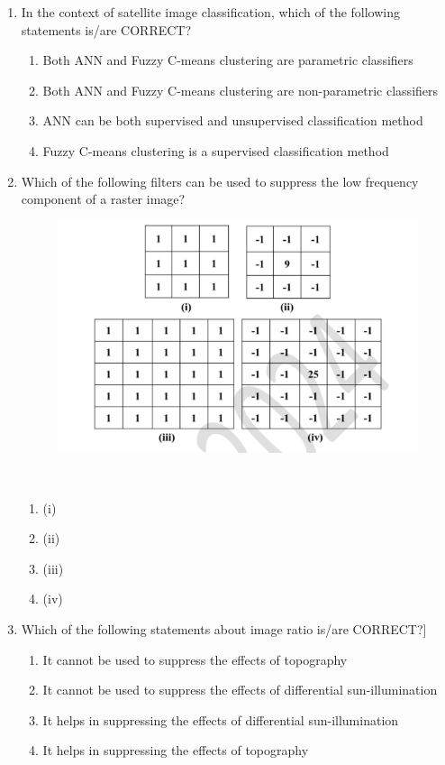 \documentclass[12pt]{article}
\begin{document}
\begin{enumerate}
\item In the context of satellite image classification, which of the following statements
is/are CORRECT? 
\begin{enumerate}
    \item Both ANN and Fuzzy C-means clustering are parametric classifiers 
   \item Both ANN and Fuzzy C-means clustering are non-parametric classifiers 
   \item ANN can be both supervised and unsupervised classification method 
   \item Fuzzy C-means clustering is a supervised classification method
\end{enumerate}

\item Which of the following filters can be used to suppress the low frequency component
of a raster image? \\

\begin{figure}[H]
\centering
\includegraphics[width=0.5\linewidth]{Figs/LatexImage11.png}
\end{figure} \\

 \begin{enumerate}
     \item(i) 
   \item (ii) 
   \item (iii) 
   \item (iv)
 \end{enumerate}

\item Which of the following statements about image ratio is/are CORRECT?]\\


\begin{enumerate}
    \item It cannot be used to suppress the effects of topography 
   \item It cannot be used to suppress the effects of differential sun-illumination 
   \item It helps in suppressing the effects of differential sun-illumination 
   \item It helps in suppressing the effects of topography 
\end{enumerate}


\end{enumerate}
\end{document}
